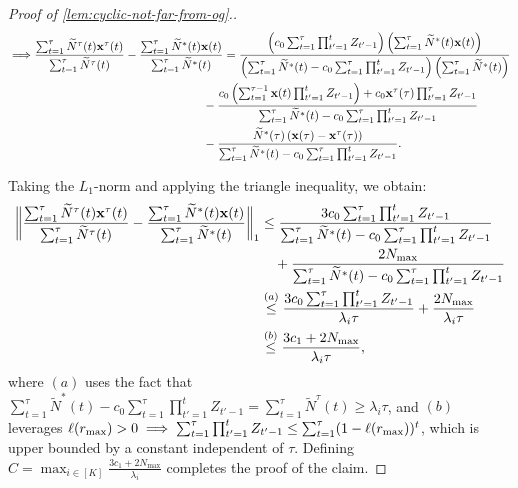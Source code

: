 \documentclass[12pt]{article}
\begin{document}
\begin{proof}[Proof of \cref{lem:cyclic-not-far-from-og}.]
\begin{align*}
     \implies &\frac{\sum_{t=1}^\tau \widetilde{N}^\tau(t)\bx^\tau(t)}{\sum_{t=1}^\tau\widetilde{N}^\tau(t)} -  \frac{\sum_{t=1}^\tau \widetilde{N}^*(t)\bx(t)}{\sum_{t=1}^\tau\widetilde{N}^*(t)} = \frac{\left(c_0 \sum_{t=1}^\tau \prod_{t'=1}^t Z_{t'-1}\right)\left(\sum_{t=1}^\tau\widetilde{N}^*(t)\bx(t)\right)}{\left(\sum_{t=1}^\tau \widetilde{N}^*(t) - c_0 \sum_{t=1}^\tau \prod_{t'=1}^t Z_{t'-1}\right)\left(\sum_{t=1}^\tau \widetilde{N}^*(t)\right)}\notag \\
     &\hspace{5cm} - \frac{c_0 \left(\sum_{t=1}^{\tau-1} \bx(t) \prod_{t'=1}^{t} Z_{t'-1} \right) +c_0 \bx^\tau(\tau) \prod_{t'=1}^\tau Z_{t'-1} }{\sum_{t=1}^\tau \widetilde{N}^*(t) - c_0 \sum_{t=1}^\tau \prod_{t'=1}^t Z_{t'-1}} \notag \\
     &\hspace{5cm}-\frac{ \widetilde{N}^*(\tau)\left(\bx(\tau)- \bx^\tau(\tau)\right)}{\sum_{t=1}^\tau \widetilde{N}^*(t) - c_0 \sum_{t=1}^\tau \prod_{t'=1}^t Z_{t'-1}} \notag.
    \end{align*}
    
    Taking the $L_1$-norm and applying the triangle inequality, we obtain:
    \begin{align*}
     \bigg{\lVert}\frac{\sum_{t=1}^\tau \widetilde{N}^\tau(t)\mathbf{x}^\tau(t)}{\sum_{t=1}^\tau\widetilde{N}^\tau(t)} -  \frac{\sum_{t=1}^\tau \widetilde{N}^*(t)\mathbf{x}(t)}{\sum_{t=1}^\tau\widetilde{N}^*(t)}\bigg{\rVert}_1 &\leq \frac{3c_0 \sum_{t=1}^\tau \prod_{t'=1}^t Z_{t'-1}}{\sum_{t=1}^\tau \widetilde{N}^*(t) - c_0 \sum_{t=1}^\tau \prod_{t'=1}^t Z_{t'-1}} \notag \\
     &\quad+ \frac{2N_{\max}}{\sum_{t=1}^\tau \widetilde{N}^*(t) - c_0 \sum_{t=1}^\tau \prod_{t'=1}^t Z_{t'-1}} \\
     &\stackrel{(a)}{\leq} \frac{3c_0 \sum_{t=1}^\tau \prod_{t'=1}^t Z_{t'-1}}{\lambda_i\tau} + \frac{2N_{\max}}{\lambda_i\tau} \\
     &\stackrel{(b)}{\leq} \frac{3c_1 + 2N_{\max}}{\lambda_i\tau},
\end{align*}
where $(a)$ uses the fact that  $\sum_{t=1}^\tau \widetilde{N}^*(t) - c_0 \sum_{t=1}^\tau \prod_{t'=1}^t Z_{t'-1} =  \sum_{t=1}^\tau \widetilde{N}^\tau(t) \geq \lambda_i \tau$, and $(b)$ leverages $\ell(r_{\max}) > 0 \implies \sum_{t=1}^\tau \prod_{t'=1}^t Z_{t'-1} \leq \sum_{t=1}^\tau (1-\ell(r_{\max}))^t$, which is upper bounded by a constant independent of $\tau$. Defining $C = \max_{i\in [K]} \frac{3c_1 + 2N_{\max}}{\lambda_i}$ completes the proof of the claim.
\end{proof}
\end{document}
